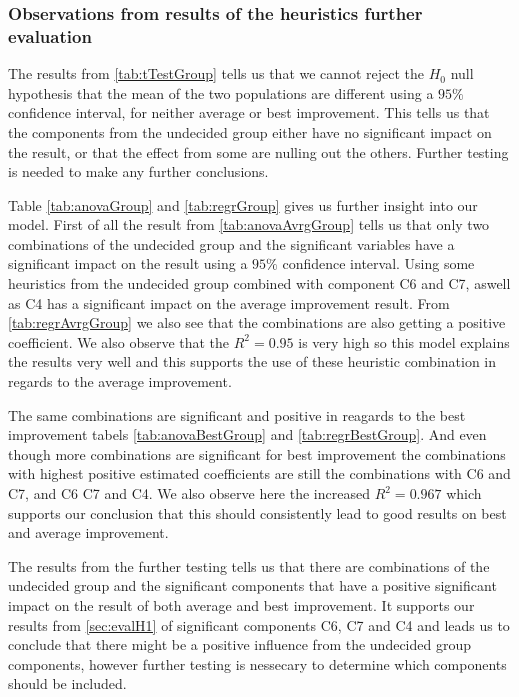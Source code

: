 \documentclass[../main.tex]{subfiles}
\begin{document}
\subsubsection{Observations from results of the heuristics further evaluation}
The results from \cref{tab:tTestGroup} tells us that we cannot reject the $H_0$ null hypothesis  that the mean of the two populations are different using a $95\%$ confidence interval, for neither average or best improvement.
This tells us that the components from the undecided group either have no significant impact on the result, or that the effect from some are nulling out the others. Further testing is needed to make any further conclusions. \par
Table \ref{tab:anovaGroup} and \cref{tab:regrGroup} gives us further insight into our model.
First of all the result from \cref{tab:anovaAvrgGroup} tells us that only two combinations of the undecided group and the significant variables have a significant impact on the result using a $95\%$ confidence interval.
Using some heuristics from the undecided group combined with component C6 and C7, aswell as C4 has a significant impact on the average improvement result.
From \cref{tab:regrAvrgGroup} we also see that the combinations are also getting a positive coefficient.
We also observe that the $R^2 = 0.95$ is very high so this model explains the results very well and this supports the use of these heuristic combination in regards to the average improvement.
\par
The same combinations are significant and positive in reagards to the best improvement tabels \cref{tab:anovaBestGroup} and \cref{tab:regrBestGroup}.
And even though more combinations are significant for best improvement the combinations with highest positive estimated coefficients are still the combinations with C6 and C7, and C6 C7 and C4.
We also observe here the increased $R^2 = 0.967$ which supports our conclusion that this should consistently lead to good results on best and average improvement.
\par
The results from the further testing tells us that there are combinations of the undecided group and the significant components that have a positive significant impact on the result of both average and best improvement. 
It supports our results from \cref{sec:evalH1} of significant components C6, C7 and C4 and leads us to conclude that there might be a positive influence from the undecided group components, however further testing is nessecary to determine which components should be included. 
\end{document}
